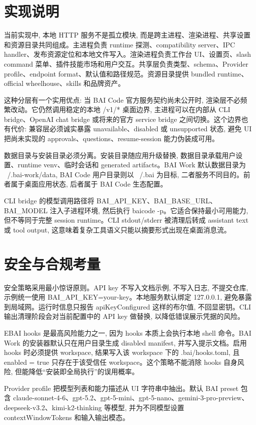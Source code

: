 \section{实现说明}
当前实现中, 本地 HTTP 服务不是孤立模块, 而是跨主进程、渲染进程、共享设置和资源目录共同组成。主进程负责 runtime 探测、compatibility server、IPC handler、发布资源定位和本地文件写入。渲染进程负责工作台 UI、设置页、slash command 菜单、插件技能市场和用户交互。共享层负责类型、schema、Provider profile、endpoint format、默认值和路径规范。资源目录提供 bundled runtime、official wheelhouse、skills 和品牌资产。

这种分层有一个实用优点: 当 BAI Code 官方服务契约尚未公开时, 渲染层不必频繁改动。它仍然调用稳定的本地 /v1/* 桌面边界, 主进程可以在内部从 CLI bridge、OpenAI chat bridge 或将来的官方 service bridge 之间切换。这个边界也有代价: 兼容层必须诚实暴露 unavailable、disabled 或 unsupported 状态, 避免 UI 把尚未实现的 approvals、questions、resume-session 能力伪装成可用。

数据目录与安装目录必须分离。安装目录随应用升级替换, 数据目录承载用户设置、runtime venv、临时会话和 generated artifacts。BAI Work 默认数据目录为 ~/.bai-work/data, BAI Code 用户目录则以 ~/.bai 为目标, 二者服务不同目的。前者属于桌面应用状态, 后者属于 BAI Code 生态配置。

CLI bridge 的模型调用路径将 BAI\_API\_KEY、BAI\_BASE\_URL、BAI\_MODEL 注入子进程环境, 然后执行 baicode -p。它适合保持最小可用能力, 但不等同于完整 session runtime。CLI stdout/stderr 被清理后转成 assistant text 或 tool output, 这意味着复杂工具语义只能以摘要形式出现在桌面消息流。

\section{安全与合规考量}
安全策略采用最小惊讶原则。API key 不写入文档示例, 不写入日志, 不提交仓库, 示例统一使用 BAI\_API\_KEY=your-key。本地服务默认绑定 127.0.0.1, 避免暴露到局域网。运行时信息只报告 apiKeyConfigured 这样的布尔值, 不回显密钥。CLI 输出清理阶段会对当前配置中的 API key 做替换, 以降低错误展示凭据的风险。

EBAI hooks 是最高风险能力之一, 因为 hooks 本质上会执行本地 shell 命令。BAI Work 的安装器默认只在用户目录生成 disabled manifest, 并写入提示文档。启用 hooks 时必须提供 workspace, 结果写入该 workspace 下的 .bai/hooks.toml, 且 enabled = true 只存在于该受信任 workspace。这个策略不能消除 hooks 自身风险, 但能降低“安装即全局执行”的误用概率。

Provider profile 把模型列表和能力描述从 UI 字符串中抽出。默认 BAI preset 包含 claude-sonnet-4-6、gpt-5.2、gpt-5-mini、gpt-5-nano、gemini-3-pro-preview、deepseek-v3.2、kimi-k2-thinking 等模型, 并为不同模型设置 contextWindowTokens 和输入输出模态。

